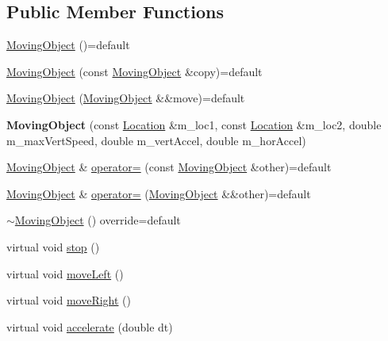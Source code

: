 \subsection*{Public Member Functions}
\begin{DoxyCompactItemize}
\item 
\hyperlink{classroadfighter_1_1MovingObject_acd1afb2c2845299fc2b6a7e729368ba9}{Moving\+Object} ()=default
\item 
\hyperlink{classroadfighter_1_1MovingObject_ae9c48dc389d0a594ea7bd108849e467f}{Moving\+Object} (const \hyperlink{classroadfighter_1_1MovingObject}{Moving\+Object} \&copy)=default
\item 
\hyperlink{classroadfighter_1_1MovingObject_a759ad597bca6a44c49adf7082fe44469}{Moving\+Object} (\hyperlink{classroadfighter_1_1MovingObject}{Moving\+Object} \&\&move)=default
\item 
\mbox{\label{classroadfighter_1_1MovingObject_a5da76d54101b6f2847dc9cdde8dd40cf}} 
{\bfseries Moving\+Object} (const \hyperlink{classroadfighter_1_1Location}{Location} \&m\+\_\+loc1, const \hyperlink{classroadfighter_1_1Location}{Location} \&m\+\_\+loc2, double m\+\_\+max\+Vert\+Speed, double m\+\_\+vert\+Accel, double m\+\_\+hor\+Accel)
\item 
\hyperlink{classroadfighter_1_1MovingObject}{Moving\+Object} \& \hyperlink{classroadfighter_1_1MovingObject_a46d710b11219a0e973eb1e4d3b375851}{operator=} (const \hyperlink{classroadfighter_1_1MovingObject}{Moving\+Object} \&other)=default
\item 
\hyperlink{classroadfighter_1_1MovingObject}{Moving\+Object} \& \hyperlink{classroadfighter_1_1MovingObject_ae2150a0937d9e1b978bcdf2ba1628677}{operator=} (\hyperlink{classroadfighter_1_1MovingObject}{Moving\+Object} \&\&other)=default
\item 
\hyperlink{classroadfighter_1_1MovingObject_aabb801baf353d53a36998983abbb803a}{$\sim$\+Moving\+Object} () override=default
\item 
virtual void \hyperlink{classroadfighter_1_1MovingObject_ac9f197ee0e91754d2fd653c0b8c84c57}{stop} ()
\item 
virtual void \hyperlink{classroadfighter_1_1MovingObject_a50bde99947cf9b5de95aeb58bd49ff9f}{move\+Left} ()
\item 
virtual void \hyperlink{classroadfighter_1_1MovingObject_a11dee0cb3d69fbc252a56ad3efef4226}{move\+Right} ()
\item 
virtual void \hyperlink{classroadfighter_1_1MovingObject_ab516489c0569b625c41a1bb9cac19d97}{accelerate} (double dt)

\end{DoxyCompactItemize}
